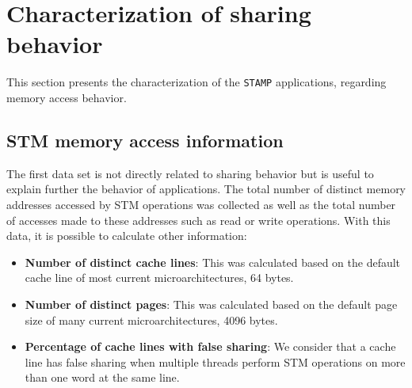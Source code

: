 \section{Characterization of sharing behavior}\label{sec:charact}

This section presents the characterization of the \texttt{STAMP} applications, regarding memory access behavior.

\subsection{STM memory access information}\label{sec:falseSharing}

The first data set is not directly related to sharing behavior but is useful to explain further the behavior of applications.
The total number of distinct memory addresses accessed by STM operations was collected as well as the total number of accesses made to these addresses such as read or write operations. With this data, it is possible to calculate other information:
\begin{itemize}
	\item \textbf{Number of distinct cache lines}: This was calculated based on the default cache line of most current microarchitectures, 64 bytes.
	
	\item \textbf{Number of distinct pages}: This was calculated based on the default page size of many current microarchitectures, 4096 bytes.
	
	\item \textbf{Percentage of cache lines with false sharing}: We consider that a cache line has false sharing when multiple threads perform STM operations on more than one word at the same line.
\end{itemize}

